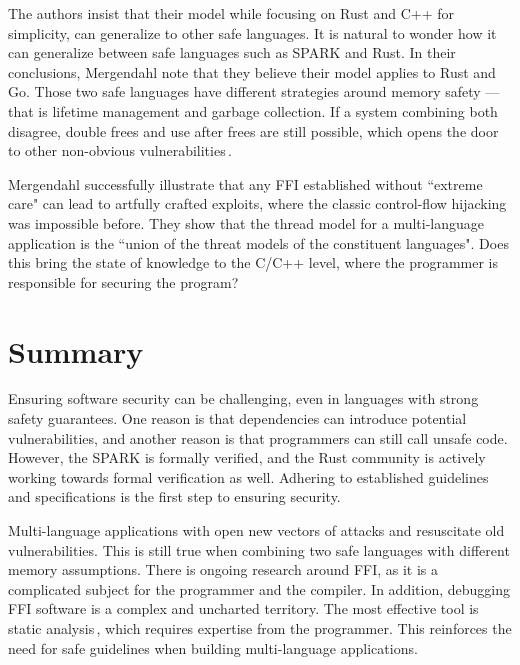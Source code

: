 \documentclass[nomenclature, english, bibtex]{kththesis}
\begin{document}
The authors insist that their model while focusing on Rust and C++ for simplicity, can generalize to other safe languages. It is natural to wonder how it can generalize between safe languages such as SPARK and Rust. In their conclusions, Mergendahl \etal note that they believe their model applies to Rust and Go. Those two safe languages have different strategies around memory safety --- that is lifetime management and garbage collection. If a system combining both disagree, double frees and use after frees are still possible, which opens the door to other non-obvious vulnerabilities\,\cite{mergendahl_cross-language_2022}.

Mergendahl \etal successfully illustrate that any FFI established without ``extreme care"\cite{mergendahl_cross-language_2022} can lead to artfully crafted exploits, where the classic control-flow hijacking was impossible before. They show that the thread model for a multi-language application is the ``union of the threat models of the constituent languages"\cite{mergendahl_cross-language_2022}. Does this bring the state of knowledge to the C/C++ level, where the programmer is responsible for securing the program?

\section{Summary}

Ensuring software security can be challenging, even in languages with strong safety guarantees. One reason is that dependencies can introduce potential vulnerabilities, and another reason is that programmers can still call unsafe code. However, the SPARK is formally verified, and the Rust community is actively working towards formal verification as well. Adhering to established guidelines and specifications is the first step to ensuring security.

Multi-language applications with  open new vectors of attacks and resuscitate old vulnerabilities. This is still true when combining two safe languages with different memory assumptions. 
There is ongoing research around FFI, as it is a complicated subject for the programmer and the compiler. In addition, debugging FFI software is a complex and uncharted territory. The most effective tool is static analysis\,\cite{li_improving_2014}, which requires expertise from the programmer.
This reinforces the need for safe guidelines when building multi-language applications.
\end{document}
